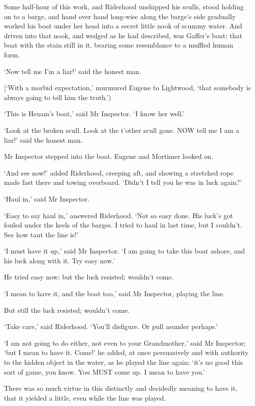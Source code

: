 Some half-hour of this work, and Riderhood unshipped his sculls, stood
holding on to a barge, and hand over hand long-wise along the barge’s
side gradually worked his boat under her head into a secret little
nook of scummy water. And driven into that nook, and wedged as he had
described, was Gaffer’s boat; that boat with the stain still in it,
bearing some resemblance to a muffled human form.

‘Now tell me I’m a liar!’ said the honest man.

[‘With a morbid expectation,’ murmured Eugene to Lightwood, ‘that
somebody is always going to tell him the truth.’)

‘This is Hexam’s boat,’ said Mr Inspector. ‘I know her well.’

‘Look at the broken scull. Look at the t’other scull gone. NOW tell me I
am a liar!’ said the honest man.

Mr Inspector stepped into the boat. Eugene and Mortimer looked on.

‘And see now!’ added Riderhood, creeping aft, and showing a stretched
rope made fast there and towing overboard. ‘Didn’t I tell you he was in
luck again?’

‘Haul in,’ said Mr Inspector.

‘Easy to say haul in,’ answered Riderhood. ‘Not so easy done. His luck’s
got fouled under the keels of the barges. I tried to haul in last time,
but I couldn’t. See how taut the line is!’

‘I must have it up,’ said Mr Inspector. ‘I am going to take this boat
ashore, and his luck along with it. Try easy now.’

He tried easy now; but the luck resisted; wouldn’t come.

‘I mean to have it, and the boat too,’ said Mr Inspector, playing the
line.

But still the luck resisted; wouldn’t come.

‘Take care,’ said Riderhood. ‘You’ll disfigure. Or pull asunder
perhaps.’

‘I am not going to do either, not even to your Grandmother,’ said Mr
Inspector; ‘but I mean to have it. Come!’ he added, at once persuasively
and with authority to the hidden object in the water, as he played the
line again; ‘it’s no good this sort of game, you know. You MUST come up.
I mean to have you.’

There was so much virtue in this distinctly and decidedly meaning to
have it, that it yielded a little, even while the line was played.

